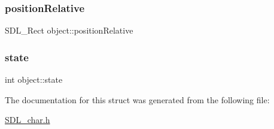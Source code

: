 \subsubsection{\texorpdfstring{positionRelative}{positionRelative}}
{\footnotesize\ttfamily S\+D\+L\+\_\+\+Rect object\+::position\+Relative}

\mbox{\label{structobject_a85d5b4e144fe0635ef91778ad2a0c3e1}} 
\subsubsection{\texorpdfstring{state}{state}}
{\footnotesize\ttfamily int object\+::state}



The documentation for this struct was generated from the following file\+:\begin{DoxyCompactItemize}
\item 
\mbox{\hyperlink{SDL__char_8h}{S\+D\+L\+\_\+char.\+h}}\end{DoxyCompactItemize}
